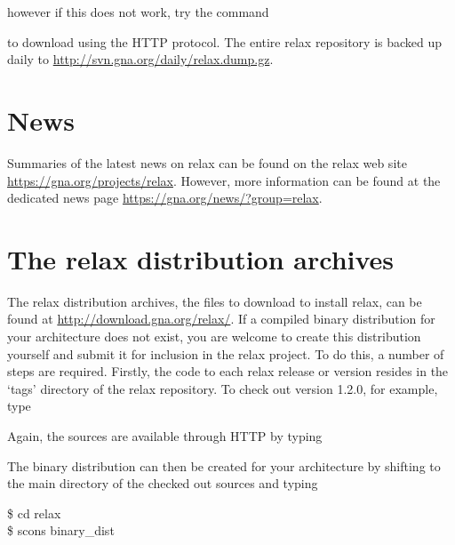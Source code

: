 however if this does not work, try the command


to download using the HTTP protocol.  The entire relax repository is backed up daily to \href{http://svn.gna.org/daily/relax.dump.gz}{http://svn.gna.org/daily/relax.dump.gz}.




\section{News}

Summaries of the latest news on relax can be found on the relax web site \href{https://gna.org/projects/relax}{https://gna.org/projects/relax}.  However, more information can be found at the dedicated news page \href{https://gna.org/news/?group=relax}{https://gna.org/news/?group=relax}.




\section{The relax distribution archives}

The relax distribution archives, the files to download to install relax, can be found at \href{http://download.gna.org/relax/}{http://download.gna.org/relax/}.  If a compiled binary distribution for your architecture does not exist, you are welcome to create this distribution yourself and submit it for inclusion in the relax project.  To do this, a number of steps are required.  Firstly, the code to each relax release or version resides in the `tags' directory of the relax repository.  To check out version 1.2.0, for example, type


Again, the sources are available through HTTP by typing


The binary distribution can then be created for your architecture by shifting to the main directory of the checked out sources and typing

\begin{exampleenv}
\$ cd relax \\
\$ scons binary\_dist
\end{exampleenv}


